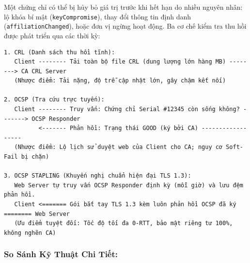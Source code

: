 \documentclass[
]{article}
\begin{document}
Một chứng chỉ có thể bị hủy bỏ giá trị trước khi hết hạn do nhiều nguyên
nhân: lộ khóa bí mật (\texttt{keyCompromise}), thay đổi thông tin định
danh (\texttt{affiliationChanged}), hoặc đơn vị ngừng hoạt động. Ba cơ
chế kiểm tra thu hồi được phát triển qua các thời kỳ:

\begin{verbatim}
1. CRL (Danh sách thu hồi tĩnh):
   Client -------- Tải toàn bộ file CRL (dung lượng lớn hàng MB) --------> CA CRL Server
   (Nhược điểm: Tải nặng, độ trễ cập nhật lớn, gây chậm kết nối)

2. OCSP (Tra cứu trực tuyến):
   Client -------- Truy vấn: Chứng chỉ Serial #12345 còn sống không? -------> OCSP Responder
          <------- Phản hồi: Trạng thái GOOD (ký bởi CA) ------------------
   (Nhược điểm: Lộ lịch sử duyệt web của Client cho CA; nguy cơ Soft-Fail bị chặn)

3. OCSP STAPLING (Khuyến nghị chuẩn hiện đại TLS 1.3):
   Web Server tự truy vấn OCSP Responder định kỳ (mỗi giờ) và lưu đệm phản hồi.
   Client <======= Gói bắt tay TLS 1.3 kèm luôn phản hồi OCSP đã ký ======== Web Server
   (Ưu điểm tuyệt đối: Tốc độ tối đa 0-RTT, bảo mật riêng tư 100%, không nghẽn CA)
\end{verbatim}

\subsubsection{So Sánh Kỹ Thuật Chi
Tiết:}\label{so-suxe1nh-kux1ef9-thuux1eadt-chi-tiux1ebft}
\end{document}

